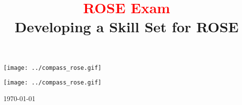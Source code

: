 \documentclass[10pt]{book}
\begin{document}
%
%


\title{ {\bf \textcolor{red}{ ROSE Exam }} \\
Developing a Skill Set for ROSE
}

\author{ }




\begin{htmlonly}
   \centering \texttt{[image: ../compass\_rose.gif]}
\end{htmlonly}

\maketitle

\begin{htmlonly}
   \centering \texttt{[image: ../compass\_rose.gif]}
\end{htmlonly}

\begin{center}
\today
\end{center}







\end{document}
